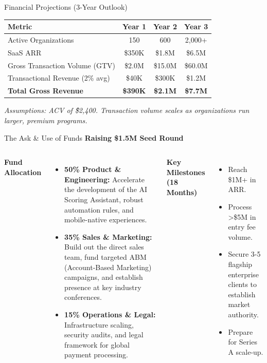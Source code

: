 \documentclass[aspectratio=169, 10pt]{beamer}
\begin{document}
\begin{frame}{Financial Projections (3-Year Outlook)}
    \begin{center}
        \renewcommand{\arraystretch}{1.5}
        \begin{tabular}{lccc}
            \toprule
            \textbf{Metric} & \textbf{Year 1} & \textbf{Year 2} & \textbf{Year 3} \\
            \midrule
            Active Organizations & 150 & 600 & 2,000+ \\
            SaaS ARR & \$350K & \$1.8M & \$6.5M \\
            Gross Transaction Volume (GTV) & \$2.0M & \$15.0M & \$60.0M \\
            Transactional Revenue (2\% avg) & \$40K & \$300K & \$1.2M \\
            \textbf{Total Gross Revenue} & \textbf{\$390K} & \textbf{\$2.1M} & \textbf{\$7.7M} \\
            \bottomrule
        \end{tabular}
    \end{center}
    \vspace{0.3cm}
    \textit{\small Assumptions: ACV of \~\$2,400. Transaction volume scales as organizations run larger, premium programs.}
\end{frame}

\begin{frame}{The Ask \& Use of Funds}
    \textbf{\Large Raising \$1.5M Seed Round}
    
    \vspace{0.4cm}
    \begin{columns}
        \textbf{Fund Allocation}
        \begin{itemize}
            \item \textbf{50\% Product \& Engineering:} Accelerate the development of the AI Scoring Assistant, robust automation rules, and mobile-native experiences.
            \item \textbf{35\% Sales \& Marketing:} Build out the direct sales team, fund targeted ABM (Account-Based Marketing) campaigns, and establish presence at key industry conferences.
            \item \textbf{15\% Operations \& Legal:} Infrastructure scaling, security audits, and legal framework for global payment processing.
        \end{itemize}
        
        \textbf{Key Milestones (18 Months)}
        \begin{itemize}
            \item Reach \$1M+ in ARR.
            \item Process >\$5M in entry fee volume.
            \item Secure 3-5 flagship enterprise clients to establish market authority.
            \item Prepare for Series A scale-up.
        \end{itemize}
    \end{columns}
\end{frame}
\end{document}
